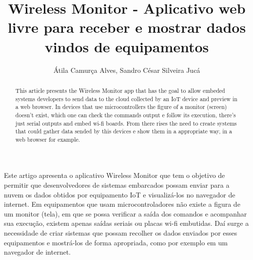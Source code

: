 \documentclass[a4paper,12pt]{article}
\title{Wireless Monitor - Aplicativo web livre para receber e mostrar dados vindos de equipamentos \iot}
\author{Átila Camurça Alves\inst{1}, Sandro César Silveira Jucá\inst{1}}
\newcommand{\wm}{Wireless Monitor\xspace}
\newcommand{\iot}{IoT\xspace}
\begin{document}
\maketitle

\begin{abstract}
This article presents the \wm app that has the goal to allow
embeded systems developers to send data to the cloud collected by
an \iot device and preview in a web browser.
In devices that use microcontrollers the figure of a monitor (screen)
doesn't exist, which one can check the commands output e follow
its execution, there's just serial outputs and embed wi-fi boards.
From there rises the need to create systems that could gather data
sended by this devices e show them in a appropriate way, in a web browser
for example.
\end{abstract}
     
\begin{resumo}
Este artigo apresenta o aplicativo \wm que tem o objetivo de permitir que
desenvolvedores de sistemas embarcados possam enviar para a nuvem
os dados obtidos por equipamento \iot e visualizá-los no navegador de internet.
Em equipamentos que usam microcontroladores não existe a figura de
um monitor (tela), em que se possa verificar a saída dos comandos e acompanhar
sua execução, existem apenas saídas seriais ou placas wi-fi embutidas.
Daí surge a necessidade de criar sistemas que possam recolher os dados
enviados por esses equipamentos e mostrá-los de forma apropriada, como por exemplo
em um navegador de internet.
\end{resumo}





\end{document}
